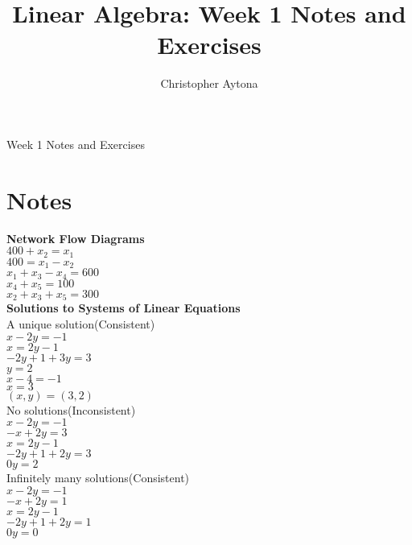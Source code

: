 \documentclass[]{article}
\title{Linear Algebra: Week 1 Notes and Exercises}
\author{Christopher Aytona}
\begin{document}
\begin{center}
\Huge{Week 1 Notes and Exercises}
\end{center}

\section{Notes}
\textbf{Network Flow Diagrams}\\
$400 + x_2 = x_1$\\
$400 = x_1 - x_2$\\
$x_1 + x_3 - x_4 = 600$\\
$x_4 + x_5 = 100$\\
$x_2 + x_3 + x_5 = 300$\\

\textbf{Solutions to Systems of Linear Equations}\\
\textsf{A unique solution(Consistent)}\\
$x - 2y = -1$\\
$x = 2y-1$\\
$-2y+1+3y = 3$\\
$y = 2$\\
$x - 4 = -1$\\
$x = 3$\\
$(x, y) = (3, 2)$\\
\textsf{No solutions(Inconsistent)}\\
$x - 2y = -1$\\
$-x+2y=3$\\
$x = 2y-1$\\
$-2y+1+2y=3$\\
$0y=2$\\
\textsf{Infinitely many solutions(Consistent)}\\
$x-2y=-1$\\
$-x+2y=1$\\
$x=2y-1$\\
$-2y+1+2y=1$\\
$0y=0$\\
\end{document}
